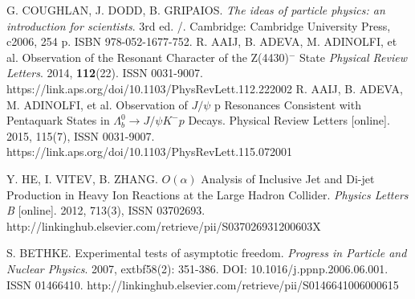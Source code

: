 \documentclass[thesismargins, thesislinespacing]{rnthesis}
\begin{document}
\begin{thebibliography}{}

G. COUGHLAN, J. DODD, B. GRIPAIOS. \textit{The ideas of particle physics: an introduction for scientists}. 3rd ed. /. Cambridge: Cambridge University Press, c2006, 254 p. ISBN 978-052-1677-752.
R. AAIJ, B. ADEVA, M. ADINOLFI, et al. Observation of the Resonant Character of the Z(4430)$^{-}$ State \textit{Physical Review Letters}. 2014, \textbf{112}(22). ISSN 0031-9007. https://link.aps.org/doi/10.1103/PhysRevLett.112.222002
R. AAIJ, B. ADEVA, M. ADINOLFI, et al. Observation of $J / \psi$ p Resonances Consistent with Pentaquark States in $\Lambda_b^0 \rightarrow J / \psi K^{-}p$ Decays. Physical Review Letters [online]. 2015, 115(7),  ISSN 0031-9007. https://link.aps.org/doi/10.1103/PhysRevLett.115.072001

Y. HE, I. VITEV, B. ZHANG. 
 $O(\alpha)$ Analysis of Inclusive Jet and Di-jet Production in Heavy Ion Reactions at the Large Hadron Collider. \textit{Physics Letters B} [online]. 2012, 713(3), ISSN 03702693. http://linkinghub.elsevier.com/retrieve/pii/S037026931200603X

S. BETHKE. Experimental tests of asymptotic freedom. \textit{Progress in Particle and Nuclear Physics}. 2007, extbf{58}(2): 351-386. DOI: 10.1016/j.ppnp.2006.06.001. ISSN 01466410.  http://linkinghub.elsevier.com/retrieve/pii/S0146641006000615


\end{thebibliography}
\end{document}
